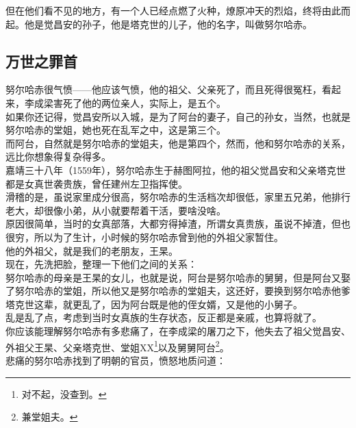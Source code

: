 \begin{multicols}{\theparacolNo}
但在他们看不见的地方，有一个人已经点燃了火种，燎原冲天的烈焰，终将由此而起。他是觉昌安的孙子，他是塔克世的儿子，他的名字，叫做努尔哈赤。\\

\subsection{万世之罪首}
努尔哈赤很气愤——他应该气愤，他的祖父、父亲死了，而且死得很冤枉，看起来，李成梁害死了他的两位亲人，实际上，是五个。\\

如果你还记得，觉昌安所以入城，是为了阿台的妻子，自己的孙女，当然，也就是努尔哈赤的堂姐，她也死在乱军之中，这是第三个。\\

而阿台，自然就是努尔哈赤的堂姐夫，他是第四个，然而，他和努尔哈赤的关系，远比你想象得复杂得多。\\

嘉靖三十八年（1559年），努尔哈赤生于赫图阿拉，他的祖父觉昌安和父亲塔克世都是女真世袭贵族，曾任建州左卫指挥使。\\

滑稽的是，虽说家里成分很高，努尔哈赤的生活档次却很低，家里五兄弟，他排行老大，却很像小弟，从小就要帮着干活，要啥没啥。\\

原因很简单，当时的女真部落，大都穷得掉渣，所谓女真贵族，虽说不掉渣，但也很穷，所以为了生计，小时候的努尔哈赤曾到他的外祖父家暂住。\\

他的外祖父，就是我们的老朋友，王杲。\\

现在，先洗把脸，整理一下他们之间的关系：\\

努尔哈赤的母亲是王杲的女儿，也就是说，阿台是努尔哈赤的舅舅，但是阿台又娶了努尔哈赤的堂姐，所以他又是努尔哈赤的堂姐夫，这还好，要换到努尔哈赤他爹塔克世这辈，就更乱了，因为阿台既是他的侄女婿，又是他的小舅子。\\

乱是乱了点，考虑到当时女真族的生存状态，反正都是亲戚，也算将就了。\\

你应该能理解努尔哈赤有多悲痛了，在李成梁的屠刀之下，他失去了祖父觉昌安、外祖父王杲、父亲塔克世、堂姐XX\footnote{对不起，没查到。}以及舅舅阿台\footnote{兼堂姐夫。}。\\

悲痛的努尔哈赤找到了明朝的官员，愤怒地质问道：\\


\end{multicols}
